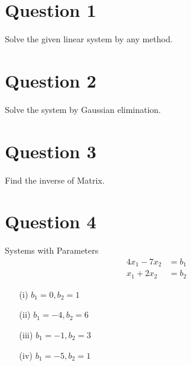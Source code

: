 \documentclass[12pt]{article}
\begin{document}
\section*{Question 1}
Solve the given linear system by any method.





\section*{Question 2}
Solve the system by Gaussian elimination.




\section*{Question 3}
Find the inverse of Matrix.








\section*{Question 4}
Systems with Parameters
\[
\begin{aligned}
4x_1 - 7x_2 &= b_1\\
x_1 + 2x_2 &= b_2
\end{aligned}
\]

\begin{itemize}
\item[(i)] $b_1 = 0, b_2 = 1$
\item[(ii)] $b_1 = -4, b_2 = 6$
\item[(iii)] $b_1 = -1, b_2 = 3$
\item[(iv)] $b_1 = -5, b_2 = 1$
\end{itemize}





\end{document}
